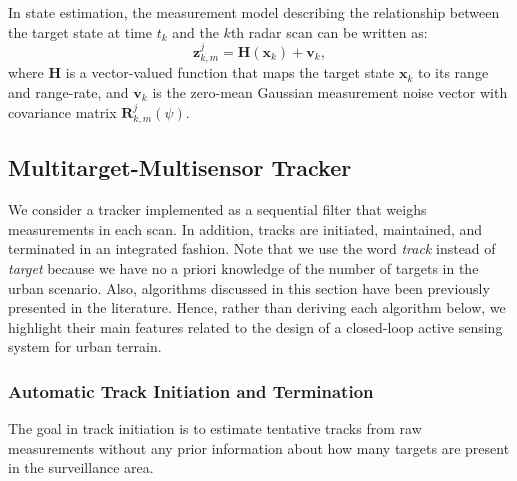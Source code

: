 \documentclass[times]{asjcauth}
\begin{document}
In state estimation, the measurement model describing the relationship between the target state at time $t_{k}$ and the $k$th radar scan can be written as:
\begin{equation*}
\mathbf{z}_{k,m}^{j} = \mathbf{H}\left(\mathbf{x}_{k}\right) + \mathbf{v}_{k},
\end{equation*}
\noindent where $\mathbf{H}$ is a vector-valued function that maps the target state $\mathbf{x}_{k}$ to its range and range-rate, and $\mathbf{v}_{k}$ is the zero-mean Gaussian measurement noise vector with covariance matrix $\mathbf{R}_{k,m}^{j}(\psi)$.

\subsection{Multitarget-Multisensor Tracker}

We consider a tracker implemented as a sequential filter that weighs measurements in each scan. In addition, tracks are initiated, maintained, and terminated in an integrated fashion. Note that we use the word \textit{track} instead of \textit{target} because we have no a priori knowledge of the number of targets in the urban scenario. Also, algorithms discussed in this section have been previously presented in the literature. Hence, rather than deriving each algorithm below, we highlight their main features related to the design of a closed-loop active sensing system for urban terrain.

\subsubsection{Automatic Track Initiation and Termination}

The goal in track initiation is to estimate tentative tracks from raw measurements without any prior information about how many targets are present in the surveillance area.
\end{document}
